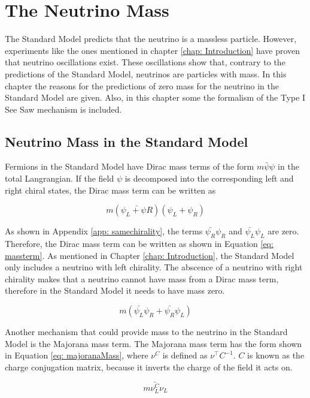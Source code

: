 \chapter{The Neutrino Mass}

The Standard Model predicts that the neutrino is a massless particle. However, experiments like the ones mentioned in chapter \ref{chap: Introduction} have proven that neutrino oscillations exist. These oscillations show that, contrary to the predictions of the Standard Model, neutrinos are particles with mass. In this chapter the reasons for the predictions of zero mass for the neutrino in the Standard Model are given. Also, in this chapter some the formalism of the Type I See Saw mechanism is included.  

\section{Neutrino Mass in the Standard Model}

Fermions in the Standard Model have Dirac mass terms of the form $m\bar{\psi}\psi$ in the total Langrangian. If the field $\psi$ is decomposed into the corresponding left and right chiral states, the Dirac mass term can be written as 

$$m(\bar{\psi_{L} + \psi{R}})(\psi_{L} + \psi_{R})$$

As shown in Appendix \ref{app: samechirality}, the terms $\bar{\psi_{R}}\psi_{R}$ and $\bar{\psi_{L}}\psi_{L}$ are zero. Therefore, the Dirac mass term can be written as shown in Equation \ref{eq: massterm}. As mentioned in Chapter \ref{chap: Introduction}, the Standard Model only includes a neutrino with left chirality. The abscence of a neutrino with right chirality makes that a neutrino cannot have mass from a Dirac mass term, therefore in the Standard Model it needs to have mass zero.

\begin{equation} \label{eq: massterm}
m \left(\bar{\psi_{L}}\psi_{R} + \bar{\psi_{R}}\psi_{L}\right)
\end{equation}

Another mechanism that could provide mass to the neutrino in the Standard Model is the Majorana mass term. The Majorana mass term has the form shown in Equation \ref{eq: majoranaMass}, where $\nu^{C}$ is defined as $\nu^{\intercal}C^{-1}$. $C$ is known as the charge conjugation matrix, because it inverts the charge of the field it acts on. 

\begin{equation}\label{eq: majoranaMass}
m \bar{\nu_{L}^{C}}\nu_{L}
\end{equation}

